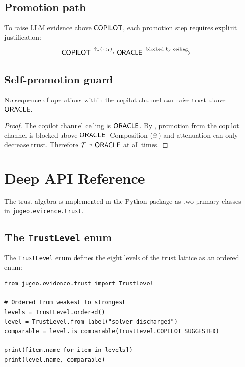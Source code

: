 \documentclass[11pt]{article}
\begin{document}
\subsection{Promotion path}

To raise LLM evidence above $\mathsf{COPILOT}$, each promotion step
requires explicit justification:
\[
  \mathsf{COPILOT}
  \xrightarrow{\uparrow_\pi(\cdot, j_1)} \mathsf{ORACLE}
  \xrightarrow{\text{blocked by ceiling}}
\]

\subsection{Self-promotion guard}

\begin{proposition}
\label{prop:ai-ceiling}
No sequence of operations within the copilot channel can
raise trust above $\mathsf{ORACLE}$.
\end{proposition}

\begin{proof}
The copilot channel ceiling is $\mathsf{ORACLE}$.  By
, promotion from the copilot channel is
blocked above $\mathsf{ORACLE}$.  Composition ($\oplus$)
and attenuation can only decrease trust.
Therefore $\mathcal{T} \preceq \mathsf{ORACLE}$ at all times.
\end{proof}


\section{Deep \JuGeo{} API Reference}\label{sec:api}

The trust algebra is implemented in the \JuGeo{} Python package
as two primary classes in \texttt{jugeo.evidence.trust}.

\subsection{The \texttt{TrustLevel} enum}

The \texttt{TrustLevel} enum defines the eight levels of the
trust lattice as an ordered enum:

\begin{lstlisting}[caption={The TrustLevel enum.},label=lst:trustlevel]
from jugeo.evidence.trust import TrustLevel

# Ordered from weakest to strongest
levels = TrustLevel.ordered()
level = TrustLevel.from_label("solver_discharged")
comparable = level.is_comparable(TrustLevel.COPILOT_SUGGESTED)

print([item.name for item in levels])
print(level.name, comparable)
\end{lstlisting}
\end{document}
